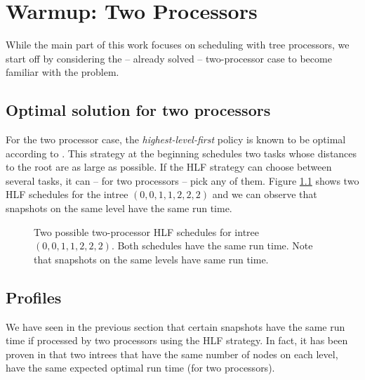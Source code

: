 \chapter{Warmup: Two Processors}
\label{chap:p2}

While the main part of this work focuses on scheduling with tree processors, we start off by considering the -- already solved -- two-processor case to become familiar with the problem. 


\section{Optimal solution for two processors}
\label{sec:p2-hlf-is-optimal}

For the two processor case, the \emph{highest-level-first} policy is known to be optimal according to \cite{chandyreynoldsshortpaper1975}. This strategy at the beginning schedules two tasks whose distances to the root are as large as possible. If the HLF strategy can choose between several tasks, it can -- for two processors -- pick any of them. Figure \ref{fig:p2-intro-example} shows two HLF schedules for the intree $(0,0,1,1,2,2,2)$ and we can observe that snapshots on the same level have the same run time.

\begin{figure}[h!]
  \centering
  
    
  \caption{Two possible two-processor HLF schedules for intree $(0,0,1,1,2,2,2)$. Both schedules have the same run time. Note that snapshots on the same levels have same run time.}
  \label{fig:p2-intro-example}
\end{figure}

\section{Profiles}
\label{sec:p2-profiles}

We have seen in the previous section that certain snapshots have the same run time if processed by two processors using the HLF strategy. In fact, it has been proven in \cite{chandyreynoldsshortpaper1975} that two intrees that have the same number of nodes on each level, have the same expected optimal run time (for two processors).



